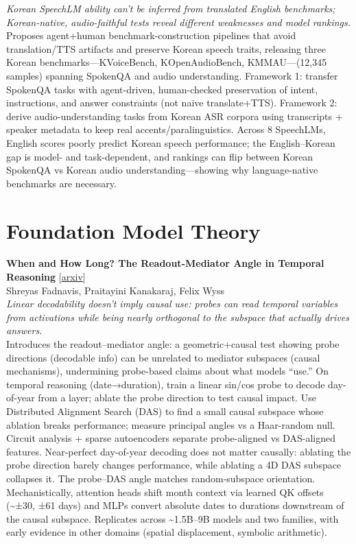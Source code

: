 \documentclass[12pt,letterpaper]{article}
\begin{document}
{\small\textit{Korean SpeechLM ability can't be inferred from translated English benchmarks; Korean-native, audio-faithful tests reveal different weaknesses and model rankings.}}\\[1pt]
{\footnotesize Proposes agent+human benchmark-construction pipelines that avoid translation/TTS artifacts and preserve Korean speech traits, releasing three Korean benchmarks---KVoiceBench, KOpenAudioBench, KMMAU---(12,345 samples) spanning SpokenQA and audio understanding. Framework 1: transfer SpokenQA tasks with agent-driven, human-checked preservation of intent, instructions, and answer constraints (not naive translate+TTS). Framework 2: derive audio-understanding tasks from Korean ASR corpora using transcripts + speaker metadata to keep real accents/paralinguistics. Across 8 SpeechLMs, English scores poorly predict Korean speech performance; the English--Korean gap is model- and task-dependent, and rankings can flip between Korean SpokenQA vs Korean audio understanding---showing why language-native benchmarks are necessary.}

\medskip


\section*{Foundation Model Theory}

{\small\textbf{When and How Long? The Readout-Mediator Angle in Temporal Reasoning}} {\scriptsize[\href{https://arxiv.org/abs/2605.29126}{arxiv}]}\\
{\scriptsize Shreyas Fadnavis, Praitayini Kanakaraj, Felix Wyss}\\

{\small\textit{Linear decodability doesn't imply causal use: probes can read temporal variables from activations while being nearly orthogonal to the subspace that actually drives answers.}}\\[1pt]
{\footnotesize Introduces the readout--mediator angle: a geometric+causal test showing probe directions (decodable info) can be unrelated to mediator subspaces (causal mechanisms), undermining probe-based claims about what models ``use.'' On temporal reasoning (date→duration), train a linear sin/cos probe to decode day-of-year from a layer; ablate the probe direction to test causal impact. Use Distributed Alignment Search (DAS) to find a small causal subspace whose ablation breaks performance; measure principal angles vs a Haar-random null. Circuit analysis + sparse autoencoders separate probe-aligned vs DAS-aligned features. Near-perfect day-of-year decoding does not matter causally: ablating the probe direction barely changes performance, while ablating a 4D DAS subspace collapses it. The probe--DAS angle matches random-subspace orientation. Mechanistically, attention heads shift month context via learned QK offsets (\textasciitilde{}±30, ±61 days) and MLPs convert absolute dates to durations downstream of the causal subspace. Replicates across \textasciitilde{}1.5B--9B models and two families, with early evidence in other domains (spatial displacement, symbolic arithmetic).}
\end{document}
